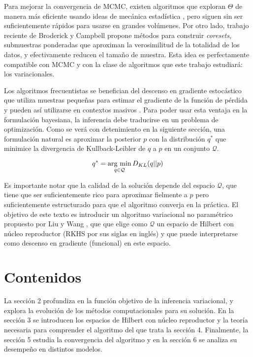 \documentclass[main.tex]{subfiles}
\begin{document}
Para mejorar la convergencia de MCMC, existen algoritmos que exploran $\Theta$ de manera más eficiente usando ideas de mecánica estadística \cite{betancourt-hmc}, pero siguen sin ser suficientemente rápidos para usarse en grandes volúmenes. Por otro lado, trabajo reciente de Broderick y Campbell \cite{coresets, coresets-greedy} propone métodos para construir \textit{coresets}, submuestras ponderadas que aproximan la verosimilitud de la totalidad de los datos, y efectivamente reducen el tamaño de muestra. Esta idea es perfectamente compatible con MCMC y con la clase de algoritmos que este trabajo estudiará: los variacionales.

Los algoritmos frecuentistas se benefician del descenso en gradiente estocástico que utiliza muestras pequeñas para estimar el gradiente de la función de pérdida y pueden así utilizarse en contextos masivos \cite{goodfellow}. Para poder usar esta ventaja en la formulación bayesiana, la inferencia debe traducirse en un problema de optimización. Como se verá con detenimiento en la siguiente sección, una formulación natural es aproximar la posterior $p$ con la distribución $q^*$ que minimice la divergencia de Kullback-Leibler de $q$ a $p$ en un conjunto $\mathcal{Q}$. 

\begin{equation}
	q^* = \operatorname*{arg\,\min}_{q \in \mathcal{Q}} D_{KL}(q || p)	
\end{equation}

Es importante notar que la calidad de la solución depende del espacio $\mathcal{Q}$, que tiene que ser suficientemente rico para aproximar fielmente a $p$ pero suficientemente estructurado para que el algoritmo converja en la práctica. El objetivo de este texto es introducir un algoritmo variacional no paramétrico propuesto por Liu y Wang \cite{svgd}, que que elige como $\mathcal{Q}$ un espacio de Hilbert con núcleo reproductor (RKHS por sus siglas en inglés) y que puede interpretarse como descenso en gradiente (funcional) en este espacio.

\section*{Contenidos} 
La sección 2 profundiza en la función objetivo de la inferencia variacional, y explora la evolución de los métodos computacionales para su solución. En la sección 3 se introducen los espacios de Hilbert con núcleo reproductor y la teoría necesaria para comprender el algoritmo del que trata la sección 4.
Finalmente, la sección 5 estudia la convergencia del algoritmo y en la sección 6 se analiza su desempeño en distintos modelos.
\end{document}
